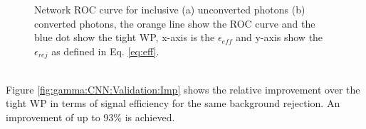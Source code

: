 \begin{figure}[htbp]
    \centering
	\begin{tcolorbox}[colback=black!5!white,colframe=white!75!black]
    \caption{Network ROC curve for inclusive (a) unconverted photons (b) converted photons, the orange line show the ROC curve and the blue dot show the tight WP, x-axis is the $\epsilon_{eff}$ and y-axis show the $\epsilon_{rej}$ as defined in Eq. \ref{eq:eff}.}
    \label{fig:gamma:CNN:Validation:ROC}
    \end{tcolorbox}
    
\end{figure}
\\
Figure \ref{fig:gamma:CNN:Validation:Imp} shows the relative improvement over the tight WP in terms of signal efficiency for the same background rejection. An improvement of up to 93\% is achieved. 
